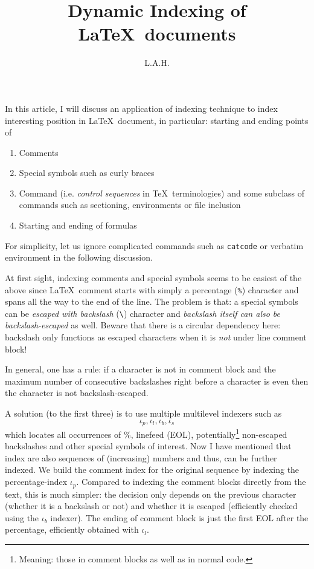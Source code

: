\documentclass{amsart}
\title{Dynamic Indexing of \LaTeX\ documents}
\author{L.A.H.}
\newcommand{\idx}{\iota}
\begin{document}
\maketitle

In this article, I will discuss an application of indexing technique to index interesting position in \LaTeX\ document, in particular: starting and ending points of
\begin{enumerate}
\item Comments
\item Special symbols such as curly braces
\item Command (i.e. \emph{control sequences} in \TeX\ terminologies) and some subclass of commands such as sectioning, environments or file inclusion
\item Starting and ending of formulas
\end{enumerate}

For simplicity, let us ignore complicated commands such as \texttt{catcode} or verbatim environment in the following discussion.

At first sight, indexing comments and special symbols seems to be easiest of the above since \LaTeX\ comment starts with simply a percentage (\texttt{\%}) character and spans all the way to the end of the line. The problem is that: a special symbols can be \emph{escaped with backslash} (\texttt{\textbackslash}) character and \emph{backslash itself can also be backslash-escaped} as well. Beware that there is a circular dependency here: backslash only functions as escaped characters when it is \emph{not} under line comment block!

In general, one has a rule: if a character is not in comment block and the maximum number of consecutive backslashes right before a character is even then the character is not backslash-escaped.

A solution (to the first three) is to use multiple multilevel indexers such as
$$\idx_p, \idx_l, \idx_b, \idx_s$$
which locates all occurrences of \%, linefeed (EOL), potentially\footnote{Meaning: those in comment blocks as well as in normal code.} non-escaped backslashes and other special symbols of interest. Now I have mentioned that index are also  sequences of (increasing) numbers and thus, can be further indexed. We build the comment index for the original sequence by indexing the percentage-index $\idx_p$. Compared to indexing the comment blocks directly from the text, this is much simpler: the decision only depends on the previous character (whether it is a backslash or not) and whether it is escaped (efficiently checked using the $\idx_b$ indexer). The ending of comment block is just the first EOL after the percentage, efficiently obtained with $\idx_l$.
\end{document}
